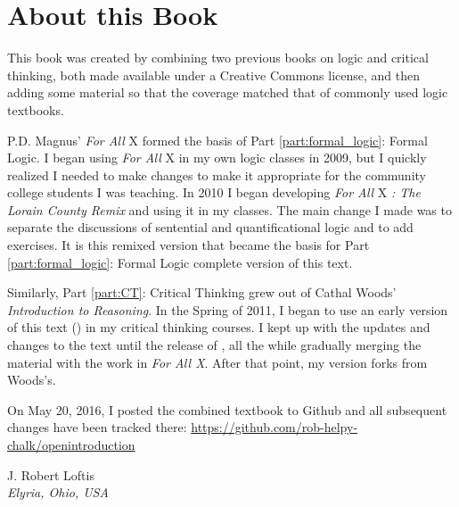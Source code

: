 
\setlength{\parindent}{1em}
\chapter{About this Book}

This book was created by combining two previous books on logic and critical thinking, both made available under a Creative Commons license, and then adding some material so that the coverage matched that of commonly used logic textbooks.

P.D. Magnus' \textit{For All} X \parencite*{Magnus2008} formed the basis of Part \ref{part:formal_logic}: Formal Logic. I began using \textit{For All} X in my own logic classes in 2009, but I quickly realized I needed to make changes to make it appropriate for the community college students I was teaching. In 2010 I began developing \textit{For All} X \textit{: The Lorain County Remix} and using it in my classes. The main change I made was to separate the discussions of sentential and quantificational logic and to add exercises. It is this remixed version that became the basis for Part \ref{part:formal_logic}: Formal Logic complete version of this text. 

Similarly, Part \ref{part:CT}: Critical Thinking grew out of Cathal Woods' \textit{Introduction to Reasoning}. In the Spring of 2011, I began to use an early version of this text (\cite{Woods2011}) in my critical thinking courses. I kept up with the updates and changes to the text until the release of \cite{Woods2014}, all the while gradually merging the material with the work in \textit{For All X}. After that point, my version forks from Woods's.

On May 20, 2016, I posted the combined textbook to Github and all subsequent changes have been tracked there: \url{https://github.com/rob-helpy-chalk/openintroduction}



 \begin{adjustwidth}{2em}{0em} 
 J. Robert Loftis \\
\noindent \emph{Elyria, Ohio, USA} 
\end{adjustwidth}

